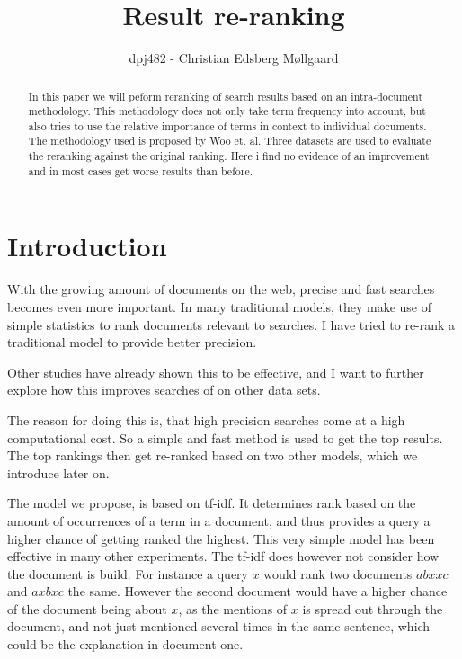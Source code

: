 \documentclass{sig-alternate}
\begin{document}
\title{Result re-ranking}
\author{
\alignauthor 
 dpj482 - Christian Edsberg Møllgaard
}
\maketitle

\begin{abstract}
In this paper we will peform reranking of search results based on an intra-document methodology. This methodology does not only take term frequency into account, but also tries to use the relative importance of terms in context to individual  documents. The methodology used is proposed by Woo et. al\cite{cummins2011improved}. Three datasets are used to evaluate the reranking against the original ranking. Here i find no evidence of an improvement and in most cases get worse results than before.
\end{abstract}
\section{Introduction}
With the growing amount of documents on the web, precise and fast searches becomes even more important. In many traditional models, they make use of simple statistics to rank documents relevant to searches. I have tried to re-rank a traditional model to provide better precision.

Other studies\cite{woo2010achieving} have already shown this to be effective, and I want to further explore how this improves searches of on other data sets.

The reason for doing this is, that high precision searches come at a high computational cost. So a simple and fast method is used to get the top results. The top rankings then get re-ranked based on two other models, which we introduce later on. 

The model we propose, is based on tf-idf. It determines rank based on the amount of occurrences of a term in a document, and thus provides a query a higher chance of getting ranked the highest. This very simple model has been effective in many other experiments. The tf-idf does however not consider how the document is build. For instance a query $x$ would rank two documents $a b x x c$ and $a x b x c$ the same. However the second document would have a higher chance of the document being about $x$, as the mentions of $x$ is spread out through the document, and not just mentioned several times in the same sentence, which could be the explanation in document one.
\end{document}
